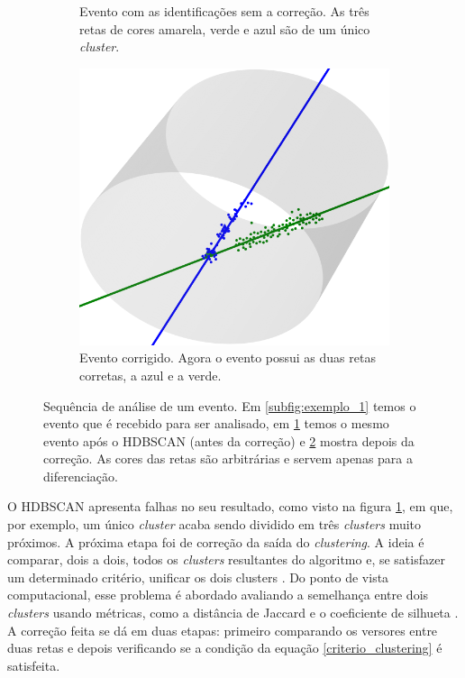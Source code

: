 \documentclass[a4paper,12pt,oneside]{book}
\begin{document}
\begin{figure}[H]
\begin{subfigure}[t]{0.45\textwidth}
        \caption{Evento com as identificações sem a correção. As três retas de cores amarela, verde e azul são de um único \textit{cluster}.}
        \label{subfig:antes_clustering}
    \end{subfigure}%
    \hspace{0.5cm}
    \begin{subfigure}[t]{0.45\textwidth}
        \centering
        \includegraphics[scale=0.25, width=.95\columnwidth]{figs/clustering_ex_3.png}
        \caption{Evento corrigido. Agora o evento possui as duas retas corretas, a azul e a verde.}
        \label{subfig:depois_clustering}
    \end{subfigure}
\caption{Sequência de análise de um evento. Em \ref{subfig:exemplo_1} temos o evento que é recebido para ser analisado, em \ref{subfig:antes_clustering} temos o mesmo evento após o HDBSCAN (antes da correção) e \ref{subfig:depois_clustering} mostra depois da correção. As cores das retas são arbitrárias e servem apenas para a diferenciação.}
\label{fig:3d_examples}
\end{figure}

\par O HDBSCAN apresenta falhas no seu resultado, como visto na figura \ref{subfig:antes_clustering}, em que, por exemplo, um único \textit{cluster} acaba sendo dividido em três \textit{clusters} muito próximos. A próxima etapa foi de correção da saída do \textit{clustering}. A ideia é comparar, dois a dois, todos os \textit{clusters} resultantes do algoritmo e, se satisfazer um determinado critério, unificar os dois clusters \cite{artigo}. Do ponto de vista computacional, esse problema é abordado avaliando a semelhança entre dois \textit{clusters} usando métricas, como a distância de Jaccard \cite{jaccard_distance} e o coeficiente de silhueta \cite{silhueta}. A correção feita se dá em duas etapas: primeiro comparando os versores entre duas retas e depois verificando se a condição da equação \ref{criterio_clustering} é satisfeita.
\end{document}
